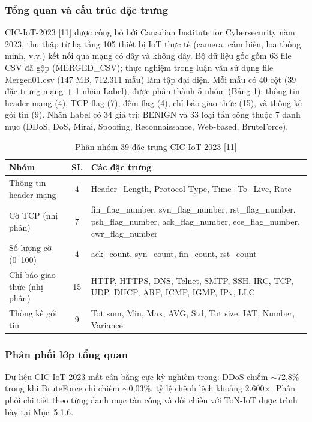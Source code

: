 \subsubsection{Tổng quan và cấu trúc đặc trưng}
CIC-IoT-2023 {[}11{]} được công bố bởi Canadian Institute for Cybersecurity năm 2023, thu thập từ hạ tầng 105 thiết bị IoT thực tế (camera, cảm biến, loa thông minh, v.v.) kết nối qua mạng có dây và không dây. Bộ dữ liệu gốc gồm 63 file CSV đã gộp (MERGED\_CSV); thực nghiệm trong luận văn sử dụng file Merged01.csv (147 MB, 712.311 mẫu) làm tập đại diện. Mỗi mẫu có 40 cột (39 đặc trưng mạng + 1 nhãn Label), được phân thành 5 nhóm (Bảng \ref{tab:cic_features}): thông tin header mạng (4), TCP flag (7), đếm flag (4), chỉ báo giao thức (15), và thống kê gói tin (9). Nhãn Label có 34 giá trị: BENIGN và 33 loại tấn công thuộc 7 danh mục (DDoS, DoS, Mirai, Spoofing, Reconnaissance, Web-based, BruteForce).

\begin{table}[H]
\centering
\caption{Phân nhóm 39 đặc trưng CIC-IoT-2023 {[}11{]}}
\label{tab:cic_features}
\small
\begin{tabular}{|l|c|p{7.5cm}|}
\hline
\textbf{Nhóm} & \textbf{SL} & \textbf{Các đặc trưng} \\
\hline
Thông tin header mạng & 4 & Header\_Length, Protocol Type, Time\_To\_Live, Rate \\
\hline
Cờ TCP (nhị phân) & 7 & fin\_flag\_number, syn\_flag\_number, rst\_flag\_number, psh\_flag\_number, ack\_flag\_number, ece\_flag\_number, cwr\_flag\_number \\
\hline
Số lượng cờ (0--100) & 4 & ack\_count, syn\_count, fin\_count, rst\_count \\
\hline
Chỉ báo giao thức (nhị phân) & 15 & HTTP, HTTPS, DNS, Telnet, SMTP, SSH, IRC, TCP, UDP, DHCP, ARP, ICMP, IGMP, IPv, LLC \\
\hline
Thống kê gói tin & 9 & Tot sum, Min, Max, AVG, Std, Tot size, IAT, Number, Variance \\
\hline
\end{tabular}
\end{table}

\subsubsection{Phân phối lớp tổng quan}
Dữ liệu CIC-IoT-2023 mất cân bằng cực kỳ nghiêm trọng: DDoS chiếm $\sim$72,8\% trong khi BruteForce chỉ chiếm $\sim$0,03\%, tỷ lệ chênh lệch khoảng 2.600$\times$. Phân phối chi tiết theo từng danh mục tấn công và đối chiếu với ToN-IoT được trình bày tại Mục~5.1.6.

